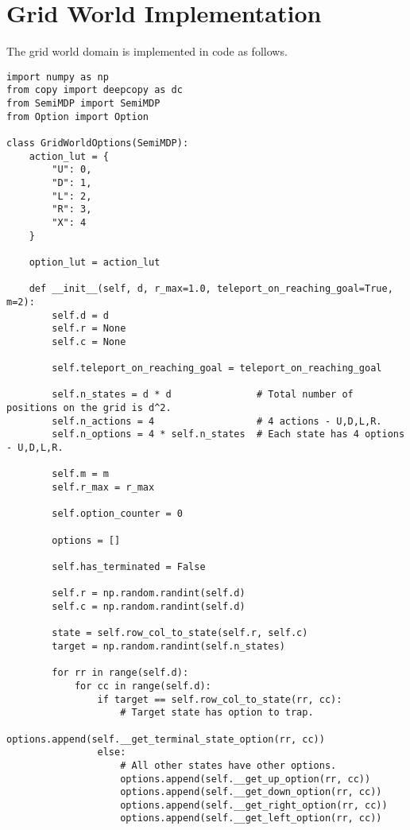 
\appendix
\chapter{Grid World Implementation}

The grid world domain is implemented in code as follows.

\begin{verbatim}
import numpy as np
from copy import deepcopy as dc
from SemiMDP import SemiMDP
from Option import Option

class GridWorldOptions(SemiMDP):
    action_lut = {
        "U": 0,
        "D": 1,
        "L": 2,
        "R": 3,
        "X": 4
    }

    option_lut = action_lut

    def __init__(self, d, r_max=1.0, teleport_on_reaching_goal=True, m=2):
        self.d = d
        self.r = None
        self.c = None

        self.teleport_on_reaching_goal = teleport_on_reaching_goal

        self.n_states = d * d               # Total number of positions on the grid is d^2.
        self.n_actions = 4                  # 4 actions - U,D,L,R.
        self.n_options = 4 * self.n_states  # Each state has 4 options - U,D,L,R.

        self.m = m
        self.r_max = r_max

        self.option_counter = 0

        options = []

        self.has_terminated = False

        self.r = np.random.randint(self.d)
        self.c = np.random.randint(self.d)

        state = self.row_col_to_state(self.r, self.c)
        target = np.random.randint(self.n_states)

        for rr in range(self.d):
            for cc in range(self.d):
                if target == self.row_col_to_state(rr, cc):
                    # Target state has option to trap.
                    options.append(self.__get_terminal_state_option(rr, cc))
                else:
                    # All other states have other options.
                    options.append(self.__get_up_option(rr, cc))
                    options.append(self.__get_down_option(rr, cc))
                    options.append(self.__get_right_option(rr, cc))
                    options.append(self.__get_left_option(rr, cc))


\end{verbatim}
